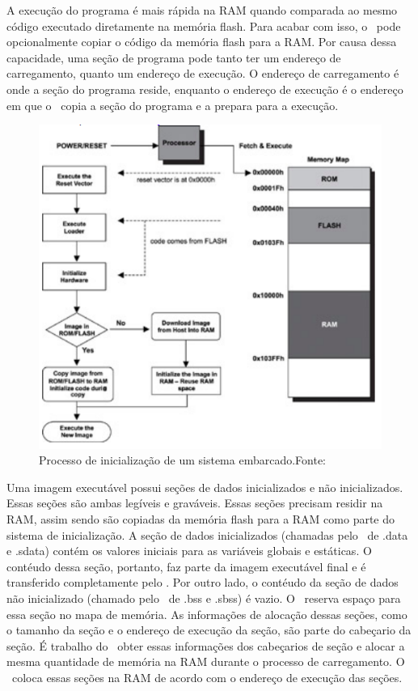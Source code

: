 A execução do programa é mais rápida na RAM quando comparada ao mesmo código executado diretamente na memória flash. Para acabar com isso, o \loader\ pode opcionalmente copiar o código da memória flash para a RAM. Por causa dessa capacidade, uma seção de programa pode tanto ter um endereço de carregamento, quanto um endereço de execução. O endereço de carregamento é onde a seção do programa reside, enquanto o endereço de execução é o endereço em que o \loader\ copia a seção do programa e a prepara para a execução.

\begin{figure}[H]
    \scriptsize
     \centering
     \includegraphics[scale=1]{dados/figuras/InicializacaoBoot.png}
     \caption{Processo de inicialização de um sistema embarcado.\newline Fonte:\cite{Qing2003}}
     \label{fig:INICIALIZAÇÃO}
\end{figure}

Uma imagem executável possui seções de dados inicializados e não inicializados. Essas seções são ambas legíveis e graváveis. Essas seções precisam residir na RAM, assim sendo são copiadas da memória flash para a RAM como parte do sistema de inicialização. A seção de dados inicializados (chamadas pelo \linker\ de .data e .sdata) contém os valores iniciais para as variáveis globais e estáticas. O contéudo dessa seção, portanto, faz parte da imagem executável final e é transferido completamente pelo \loader. Por outro lado, o contéudo da seção de dados não inicializado (chamado pelo \linker\ de .bss e .sbss) é vazio. O \linker\ reserva espaço para essa seção no mapa de memória. As informações de alocação dessas seções, como o tamanho da seção e o endereço de execução da seção, são parte do cabeçario da seção. É trabalho do \loader\ obter essas informações dos cabeçarios de seção e alocar a mesma quantidade de memória na RAM durante o processo de carregamento. O \loader\ coloca essas seções na RAM de acordo com o endereço de execução das seções.

